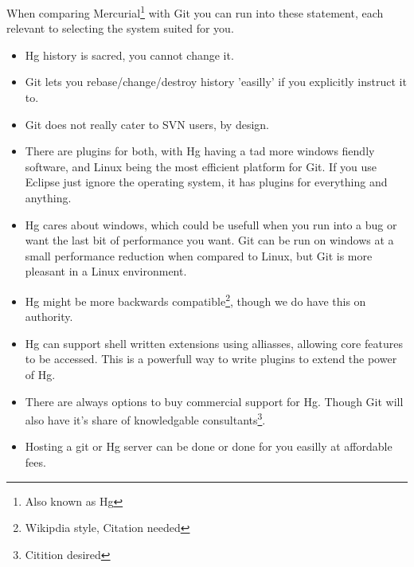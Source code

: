

When comparing Mercurial\footnote{Also known as Hg} with Git you can run into these statement, each relevant to selecting the system suited for you.
\begin{itemize}
\item
Hg history is sacred, you cannot change it.

\item
Git lets you rebase/change/destroy history 'easilly' if you explicitly instruct it to.

\item
Git does not really cater to SVN users, by design.

\item
There are plugins for both, with Hg having a tad more windows fiendly software, and Linux being the most efficient platform for Git.
If you use Eclipse just ignore the operating system, it has plugins for everything and anything.

\item
Hg cares about windows, which could be usefull when you run into a bug or want the last bit of performance you want.
Git can be run on windows at a small performance reduction when compared to Linux, but Git is more pleasant in a Linux environment.

\item
Hg might be more backwards compatible\footnote{Wikipdia style, Citation needed}, though we do have this on authority.

\item
Hg can support shell written extensions using alliasses, allowing core features to be accessed. This is a powerfull way to write plugins to extend the power of Hg.

\item
There are always options to buy commercial support for Hg.
Though Git will also have it's share of knowledgable consultants\footnote{Citition desired}.

\item
Hosting a git or Hg server can be done or done for you easilly at affordable fees.

\end{itemize}


